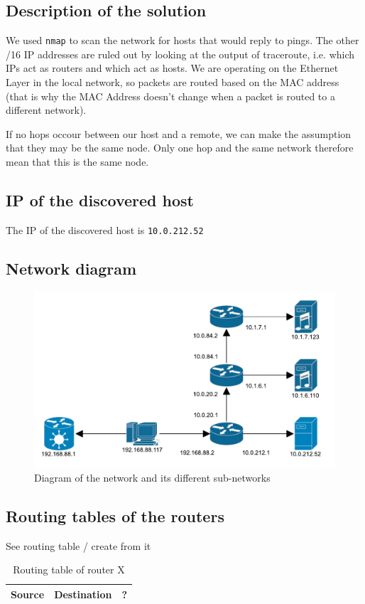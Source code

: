 \documentclass[parskip=full]{scrartcl}
\begin{document}
\subsection{Description of the solution}
We used \texttt{nmap} to scan the network for hosts that would reply to pings. 
The other /16 IP addresses are ruled out by looking at the output of traceroute, i.e. which IPs act as routers and which act as hosts.
We are operating on the Ethernet Layer in the local network, so packets are routed based on the MAC address (that is why the MAC Address doesn't change when a packet is routed to a different network).

If no hops occour between our host and a remote, we can make the assumption that they may be the same node.
Only one hop and the same network therefore mean that this is the same node.

\subsection{IP of the discovered host}
The IP of the discovered host is \texttt{10.0.212.52}
\subsection{Network diagram}
\begin{figure}[ht]
    \centering
    \includegraphics[width=\textwidth]{network_layout.pdf} 
    \caption{Diagram of the network and its different sub-networks}
    \label{fig:networkLayout}
\end{figure}
\subsection{Routing tables of the routers}
See routing table / create from it
\begin{table}
    \centering
    \begin{tabular}{c c c }
       \hline
        Source & Destination & ? \\
       \hline 
       \hline
    \end{tabular}
    \caption{Routing table of router X}
    \label{tbl:routingTableX}
\end{table}
\end{document}
